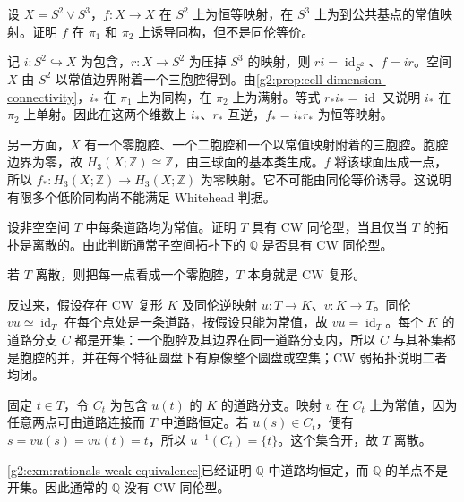 \begin{exercise}\label{g2:ex:finite-homotopy-test}
	设 \(X=S^2\vee S^3\)，\(f:X\rightarrow X\) 在 \(S^2\) 上为恒等映射，在 \(S^3\) 上为到公共基点的常值映射。证明 \(f\) 在 \(\pi_1\) 和 \(\pi_2\) 上诱导同构，但不是同伦等价。
\end{exercise}
\begin{solution}
	记 \(i:S^2\hookrightarrow X\) 为包含，\(r:X\rightarrow S^2\) 为压掉 \(S^3\) 的映射，则 \(ri=\operatorname{id}_{S^2}\)、\(f=ir\)。空间 \(X\) 由 \(S^2\) 以常值边界附着一个三胞腔得到。由\cref{g2:prop:cell-dimension-connectivity}，\(i_*\) 在 \(\pi_1\) 上为同构，在 \(\pi_2\) 上为满射。等式 \(r_*i_*=\operatorname{id}\) 又说明 \(i_*\) 在 \(\pi_2\) 上单射。因此在这两个维数上 \(i_*\)、\(r_*\) 互逆，\(f_*=i_*r_*\) 为恒等映射。

	另一方面，\(X\) 有一个零胞腔、一个二胞腔和一个以常值映射附着的三胞腔。胞腔边界为零，故 \(H_3(X;\mathbb Z)\cong\mathbb Z\)，由三球面的基本类生成。\(f\) 将该球面压成一点，所以 \(f_*:H_3(X;\mathbb Z)\rightarrow H_3(X;\mathbb Z)\) 为零映射。它不可能由同伦等价诱导。这说明有限多个低阶同构尚不能满足 Whitehead 判据。
\end{solution}

\begin{exercise}\label{g2:ex:path-discrete-cw-type}
	设非空空间 \(T\) 中每条道路均为常值。证明 \(T\) 具有 CW 同伦型，当且仅当 \(T\) 的拓扑是离散的。由此判断通常子空间拓扑下的 \(\mathbb Q\) 是否具有 CW 同伦型。
\end{exercise}
\begin{solution}
	若 \(T\) 离散，则把每一点看成一个零胞腔，\(T\) 本身就是 CW 复形。

	反过来，假设存在 CW 复形 \(K\) 及同伦逆映射 \(u:T\rightarrow K\)、\(v:K\rightarrow T\)。同伦 \(vu\simeq\operatorname{id}_T\) 在每个点处是一条道路，按假设只能为常值，故 \(vu=\operatorname{id}_T\)。每个 \(K\) 的道路分支 \(C\) 都是开集：一个胞腔及其边界在同一道路分支内，所以 \(C\) 与其补集都是胞腔的并，并在每个特征圆盘下有原像整个圆盘或空集；CW 弱拓扑说明二者均闭。

	固定 \(t\in T\)，令 \(C_t\) 为包含 \(u(t)\) 的 \(K\) 的道路分支。映射 \(v\) 在 \(C_t\) 上为常值，因为任意两点可由道路连接而 \(T\) 中道路恒定。若 \(u(s)\in C_t\)，便有 \(s=vu(s)=vu(t)=t\)，所以 \(u^{-1}(C_t)=\{t\}\)。这个集合开，故 \(T\) 离散。

	\cref{g2:exm:rationals-weak-equivalence}已经证明 \(\mathbb Q\) 中道路均恒定，而 \(\mathbb Q\) 的单点不是开集。因此通常的 \(\mathbb Q\) 没有 CW 同伦型。
\end{solution}


